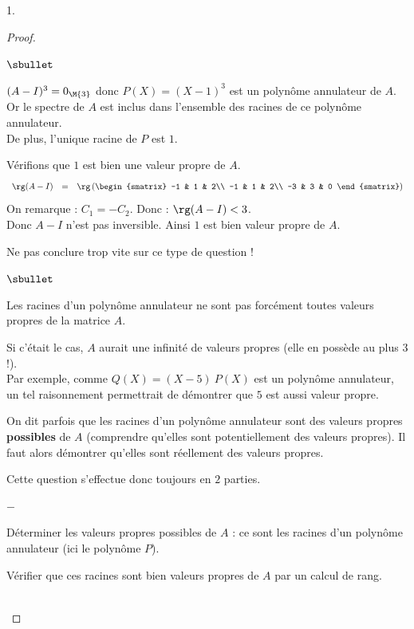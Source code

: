 \begin{noliste}{1.}
\begin{proof}~
\begin{noliste}{$\sbullet$}
\item $(A-I)^3=0_{\M{3}}$ donc $P(X)=(X-1)^3$ est un polynôme 
annulateur de $A$.\\
Or le spectre de $A$ est inclus dans l'ensemble des racines de ce 
polynôme 
annulateur.\\
De plus, l'unique racine de $P$ est $1$. 
\item Vérifions que $1$ est bien une valeur propre de $A$.
\[
\begin{array}{rcl}
  \rg(A-I) & = & \rg \left( 
    \begin{smatrix} 
      -1 & 1 & 2\\ 
      -1 & 1 & 2\\ 
      -3 & 3 & 0
    \end{smatrix} \right)
\end{array}
\]
On remarque : $C_1=-C_2$. Donc : $\rg(A-I)<3$.\\
Donc $A-I$ n'est pas inversible. Ainsi $1$ est bien valeur propre de
$A$.%
\end{noliste}

\begin{remark}%
  Ne pas conclure trop vite sur ce type de question !
  \begin{noliste}{$\sbullet$}
  \item Les racines d'un polynôme annulateur ne sont pas forcément
    toutes valeurs propres de la matrice $A$.
  \item Si c'était le cas, $A$ aurait une infinité de valeurs
    propres (elle en possède au plus $3$ !). \\
    Par exemple, comme $Q(X) = (X-5) \ P(X)$ est un polynôme annulateur,
    un tel raisonnement permettrait de démontrer que $5$ est aussi
    valeur propre.
  \item On dit parfois que les racines d'un polynôme
    annulateur sont des valeurs propres {\bf possibles} de $A$
    (comprendre qu'elles sont potentiellement des valeurs
    propres). Il faut alors démontrer qu'elles sont réellement
    des valeurs propres.
  \item Cette question s'effectue donc toujours en $2$ parties.
    \begin{noliste}{$-$}
    \item Déterminer les valeurs propres possibles de $A$ : ce sont les 
      racines d'un polynôme annulateur (ici le polynôme $P$).
    \item Vérifier que ces racines sont bien valeurs propres de $A$ par un
      calcul de rang.
    \end{noliste}
  \end{noliste}
\end{remark}~\\[-1.4cm]
\end{proof}


\end{noliste}
